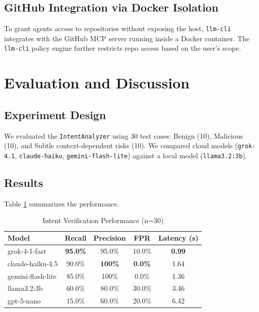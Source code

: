 \documentclass[conference]{IEEEtran}
\begin{document}
\subsection{GitHub Integration via Docker Isolation}
To grant agents access to repositories without exposing the host, \texttt{llm-cli} integrates with the GitHub MCP server running inside a Docker container. The \texttt{llm-cli} policy engine further restricts repo access based on the user's scope.

\section{Evaluation and Discussion}

\subsection{Experiment Design}
We evaluated the \texttt{IntentAnalyzer} using 30 test cases: Benign (10), Malicious (10), and Subtle context-dependent risks (10). We compared cloud models (\texttt{grok-4.1}, \texttt{claude-haiku}, \texttt{gemini-flash-lite}) against a local model (\texttt{llama3.2:3b}).

\subsection{Results}
Table \ref{tab:results} summarizes the performance.

\begin{table}[htbp]
\caption{Intent Verification Performance (n=30)}
\begin{center}
\begin{tabular}{|l|c|c|c|c|}
\hline
\textbf{Model} & \textbf{Recall} & \textbf{Precision} & \textbf{FPR} & \textbf{Latency (s)} \\
\hline
grok-4-1-fast & \textbf{95.0\%} & 95.0\% & 10.0\% & \textbf{0.99} \\
claude-haiku-4.5 & 90.0\% & \textbf{100\%} & \textbf{0.0\%} & 1.64 \\
gemini-flash-lite & 85.0\% & 100\% & 0.0\% & 1.36 \\
llama3.2:3b & 60.0\% & 80.0\% & 30.0\% & 3.46 \\
gpt-5-nano & 15.0\% & 60.0\% & 20.0\% & 6.42 \\
\hline
\end{tabular}
\label{tab:results}
\end{center}
\end{table}
\end{document}
